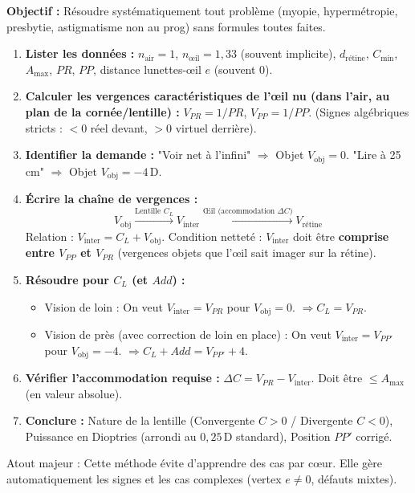 \documentclass[11pt]{article}
\newcommand{\cle}[1]{{\popxbold\color{popdark}#1}}
\begin{document}
\begin{methode}
\textbf{Objectif :} Résoudre systématiquement tout problème (myopie, hypermétropie, presbytie, astigmatisme non au prog) sans formules toutes faites.
\begin{enumerate}
    \item \textbf{Lister les données :} $n_{\text{air}}=1$, $n_{\text{œil}}=1,33$ (souvent implicite), $d_{\text{rétine}}$, $C_{\text{min}}$, $A_{\text{max}}$, $PR$, $PP$, distance lunettes-œil $e$ (souvent $0$).
    \item \textbf{Calculer les vergences caractéristiques de l'œil nu (dans l'air, au plan de la cornée/lentille) :}
    $V_{PR} = 1/PR$, $V_{PP} = 1/PP$. (Signes algébriques stricts : $<0$ réel devant, $>0$ virtuel derrière).
    \item \textbf{Identifier la demande :} "Voir net à l'infini" $\Rightarrow$ Objet $V_{\text{obj}}=0$. "Lire à 25 cm" $\Rightarrow$ Objet $V_{\text{obj}}=-4\,\text{D}$.
    \item \textbf{Écrire la chaîne de vergences :}
    \[
    V_{\text{obj}} \xrightarrow{\text{Lentille } C_L} V_{\text{inter}} \xrightarrow{\text{Œil (accommodation } \Delta C)} V_{\text{rétine}}
    \]
    Relation : $V_{\text{inter}} = C_L + V_{\text{obj}}$.
    Condition netteté : $V_{\text{inter}}$ doit être \textbf{comprise entre $V_{PP}$ et $V_{PR}$} (vergences objets que l'œil sait imager sur la rétine).
    \item \textbf{Résoudre pour $C_L$ (et $Add$) :}
    \begin{itemize}
        \item Vision de loin : On veut $V_{\text{inter}} = V_{PR}$ pour $V_{\text{obj}}=0$. $\Rightarrow C_L = V_{PR}$.
        \item Vision de près (avec correction de loin en place) : On veut $V_{\text{inter}} = V_{PP'}$ pour $V_{\text{obj}}=-4$. $\Rightarrow C_L + Add = V_{PP'} + 4$.
    \end{itemize}
    \item \textbf{Vérifier l'accommodation requise :} $\Delta C = V_{PR} - V_{\text{inter}}$. Doit être $\le A_{\text{max}}$ (en valeur absolue).
    \item \textbf{Conclure :} Nature de la lentille (Convergente $C>0$ / Divergente $C<0$), Puissance en Dioptries (arrondi au $0,25\,\text{D}$ standard), Position $PP'$ corrigé.
\end{enumerate}
\cle{Atout majeur :} Cette méthode évite d'apprendre des cas par cœur. Elle gère automatiquement les signes et les cas complexes (vertex $e \neq 0$, défauts mixtes).
\end{methode}
\end{document}
